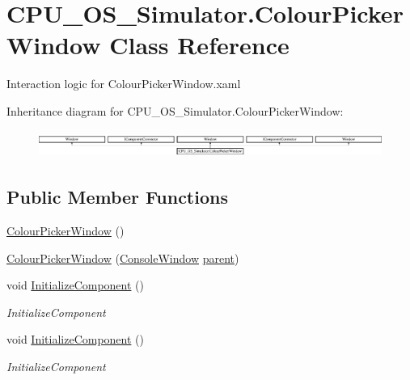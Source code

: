 \hypertarget{class_c_p_u___o_s___simulator_1_1_colour_picker_window}{}\section{C\+P\+U\+\_\+\+O\+S\+\_\+\+Simulator.\+Colour\+Picker\+Window Class Reference}
\label{class_c_p_u___o_s___simulator_1_1_colour_picker_window}


Interaction logic for Colour\+Picker\+Window.\+xaml  


Inheritance diagram for C\+P\+U\+\_\+\+O\+S\+\_\+\+Simulator.\+Colour\+Picker\+Window\+:\begin{figure}[H]
\begin{center}
\leavevmode
\includegraphics[height=0.892430cm]{class_c_p_u___o_s___simulator_1_1_colour_picker_window}
\end{center}
\end{figure}
\subsection*{Public Member Functions}
\begin{DoxyCompactItemize}
\item 
\hyperlink{class_c_p_u___o_s___simulator_1_1_colour_picker_window_afd196933703b7ee4bcac6cbfde73e65f}{Colour\+Picker\+Window} ()
\item 
\hyperlink{class_c_p_u___o_s___simulator_1_1_colour_picker_window_a6d0c7265a93ca643ad296a8664489508}{Colour\+Picker\+Window} (\hyperlink{class_c_p_u___o_s___simulator_1_1_console_window}{Console\+Window} \hyperlink{class_c_p_u___o_s___simulator_1_1_colour_picker_window_a0a40b478316b3e45a63c67347ff9fc63}{parent})
\item 
void \hyperlink{class_c_p_u___o_s___simulator_1_1_colour_picker_window_a83c3f68e51fd577446e25cfb2a8d05ed}{Initialize\+Component} ()
\begin{DoxyCompactList}\small\item\em Initialize\+Component \end{DoxyCompactList}\item 
void \hyperlink{class_c_p_u___o_s___simulator_1_1_colour_picker_window_a83c3f68e51fd577446e25cfb2a8d05ed}{Initialize\+Component} ()
\begin{DoxyCompactList}\small\item\em Initialize\+Component \end{DoxyCompactList}\end{DoxyCompactItemize}
